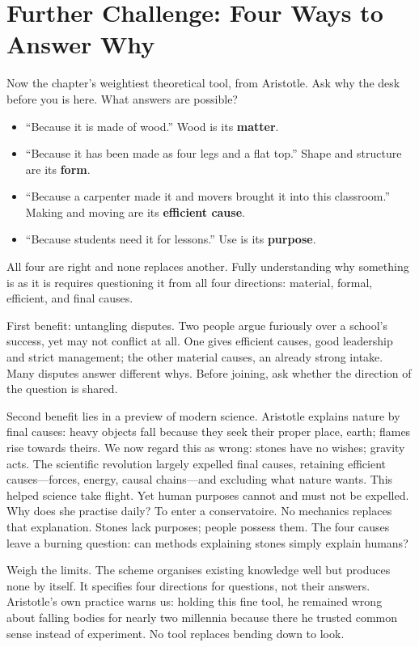 \section[Further Challenge: Four Kinds of Why]{Further Challenge: Four Ways to Answer Why}
Now the chapter's weightiest theoretical tool, from Aristotle. Ask why the desk before you is here. What answers are possible?

\begin{itemize}
\item ``Because it is made of wood.'' Wood is its \textbf{matter}.
\item ``Because it has been made as four legs and a flat top.'' Shape and structure are its \textbf{form}.
\item ``Because a carpenter made it and movers brought it into this classroom.'' Making and moving are its \textbf{efficient cause}.
\item ``Because students need it for lessons.'' Use is its \textbf{purpose}.
\end{itemize}
All four are right and none replaces another. Fully understanding why something is as it is requires questioning it from all four directions: material, formal, efficient, and final causes.

First benefit: untangling disputes. Two people argue furiously over a school's success, yet may not conflict at all. One gives efficient causes, good leadership and strict management; the other material causes, an already strong intake. Many disputes answer different whys. Before joining, ask whether the direction of the question is shared.

Second benefit lies in a preview of modern science. Aristotle explains nature by final causes: heavy objects fall because they seek their proper place, earth; flames rise towards theirs. We now regard this as wrong: stones have no wishes; gravity acts. The scientific revolution largely expelled final causes, retaining efficient causes---forces, energy, causal chains---and excluding what nature wants. This helped science take flight. Yet human purposes cannot and must not be expelled. Why does she practise daily? To enter a conservatoire. No mechanics replaces that explanation. Stones lack purposes; people possess them. The four causes leave a burning question: can methods explaining stones simply explain humans?

Weigh the limits. The scheme organises existing knowledge well but produces none by itself. It specifies four directions for questions, not their answers. Aristotle's own practice warns us: holding this fine tool, he remained wrong about falling bodies for nearly two millennia because there he trusted common sense instead of experiment. No tool replaces bending down to look.

